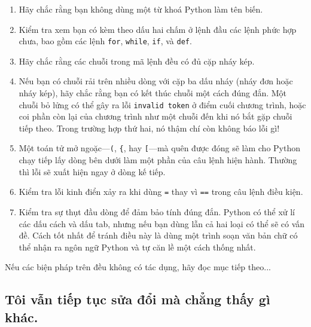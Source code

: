 \documentclass[11pt]{book}
\begin{document}
\begin{enumerate}

\item Hãy chắc rằng bạn không dùng một từ khoá Python làm tên biến.


\item Kiểm tra xem bạn có kèm theo dấu hai chấm ở lệnh đầu các lệnh phức hợp
chưa, bao gồm các lệnh {\tt for}, {\tt while},
{\tt if}, và {\tt def}.


\item Hãy chắc rằng các chuỗi trong mã lệnh đều có đủ cặp nháy kép.


\item Nếu bạn có chuỗi rải trên nhiều dòng với cặp ba dấu nháy (nháy đơn hoặc nháy kép), 
hãy chắc rằng bạn có kết thúc chuỗi một cách đúng đắn. Một chuỗi
bỏ lửng có thể gây ra lỗi {\tt invalid token} ở điểm cuối chương trình,
hoặc coi phần còn lại của chương trình như một chuỗi đến khi nó bắt gặp
chuỗi tiếp theo. Trong trường hợp thứ hai, nó thậm chí còn không báo lỗi gì!


\item Một toán tử mở ngoặc---\verb+(+, \verb+{+, hay
  \verb+[+---mà quên được đóng sẽ làm cho Python chạy tiếp lấy dòng bên dưới
  làm một phần của câu lệnh hiện hành. Thường thì lỗi sẽ xuất hiện 
  ngay ở dòng kế tiếp.

\item Kiểm tra lỗi kinh điển xảy ra khi dùng {\tt =} thay vì {\tt ==} trong
câu lệnh điều kiện.


\item Kiểm tra sự thụt đầu dòng để đảm bảo tính đúng đắn. 
Python có thể xử lí các dấu cách và dấu tab, nhưng nếu bạn dùng 
lẫn cả hai loại có thể sẽ có vấn đề. Cách tốt nhất để tránh điều này
là dùng một trình soạn văn bản chữ có thể nhận ra ngôn ngữ Python và
tự căn lề một cách thống nhất.


\end{enumerate}

Nếu các biện pháp trên đều không có tác dụng, hãy đọc mục tiếp theo...


\subsection{Tôi vẫn tiếp tục sửa đổi mà chẳng thấy gì khác.}
\end{document}
